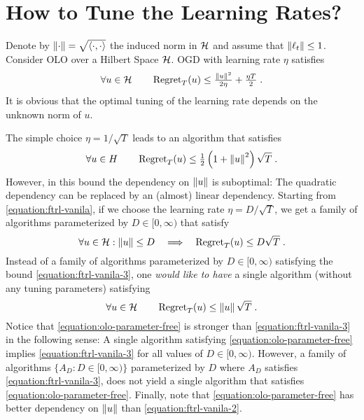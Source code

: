 \section{How to Tune the Learning Rates?}
\label{section:learning-rates}

Denote by $\left\|{\cdot}\right\| = \sqrt{\langle \cdot, \cdot \rangle}$ the induced norm in $\mathcal{H}$ and assume that $\left\|{\ell_t}\right\| \le 1$.
Consider \ac{OLO} over a Hilbert Space $\mathcal{H}$. \ac{OGD} with learning rate
$\eta$ satisfies~\citep{Shalev-Shwartz-2011}
\begin{equation}
\label{equation:ftrl-vanila}
\forall u \in \mathcal{H} \qquad \operatorname{Regret}_T(u) \le \tfrac{\left\|{u}\right\|^2}{2\eta} + \tfrac{\eta T}{2} \; .
\end{equation}
It is obvious that the optimal tuning of the learning rate depends on the
unknown norm of $u$.

The simple choice $\eta = 1/\sqrt{T}$ leads to an algorithm that satisfies
\begin{equation}
\label{equation:ftrl-vanila-2}
\forall u \in H \qquad \operatorname{Regret}_T(u) \le \tfrac{1}{2}\left(1+\left\|{u}\right\|^2\right)\sqrt{T} \; .
\end{equation}
However, in this bound the dependency on $\left\|{u}\right\|$ is suboptimal: The
quadratic dependency can be replaced by an (almost) linear dependency.
Starting from \eqref{equation:ftrl-vanila}, if we choose the learning rate
$\eta = D/\sqrt{T}$, we get a family of algorithms parameterized by $D \in
[0,\infty)$ that satisfy
\begin{equation}
\label{equation:ftrl-vanila-3}
\forall u \in \mathcal{H} : \left\|{u}\right\| \le D \quad  \Longrightarrow \quad \operatorname{Regret}_T(u) \le D \sqrt{T} \; .
\end{equation}
Instead of a family of algorithms parameterized by $D \in [0,\infty)$ satisfying
the bound \eqref{equation:ftrl-vanila-3}, one \emph{would like
to have} a single algorithm (without any tuning parameters) satisfying
\begin{equation}
\label{equation:olo-parameter-free}
\forall u \in \mathcal{H} \qquad \operatorname{Regret}_T(u) \le \left\|{u}\right\| \sqrt{T} \; .
\end{equation}
Notice that \eqref{equation:olo-parameter-free} is stronger than
\eqref{equation:ftrl-vanila-3} in the following sense: A single algorithm
satisfying \eqref{equation:olo-parameter-free} implies
\eqref{equation:ftrl-vanila-3} for all values of $D \in [0,\infty)$. However,
a family of algorithms $\{A_D : D \in [0,\infty)\}$ parameterized by $D$ where
$A_D$ satisfies \eqref{equation:ftrl-vanila-3}, does not yield a single
algorithm that satisfies \eqref{equation:olo-parameter-free}.  Finally, note
that \eqref{equation:olo-parameter-free} has better dependency on $\left\|{u}\right\|$
than \eqref{equation:ftrl-vanila-2}.


